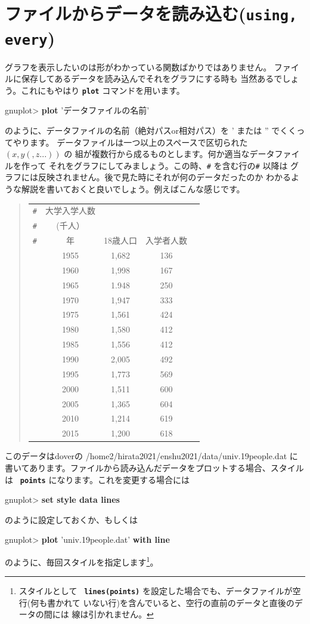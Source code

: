 \documentclass[a4j]{ujarticle} %
\newenvironment{terminal}{%
  \begin{center}
   \begin{minipage}{.8\textwidth}
    \setlength{\FrameSep}{.5\FrameSep}%
    \begin{framed}\ttfamily\small%
     \setlength\baselineskip{.85\baselineskip}%
}{%
    \end{framed}
   \end{minipage}
  \end{center}%
}
\begin{document}
\section{ファイルからデータを読み込む({\tt\bf using, every})}
グラフを表示したいのは形がわかっている関数ばかりではありません。
ファイルに保存してあるデータを読み込んでそれをグラフにする時も
当然あるでしょう。これにもやはり {\tt\bf plot} コマンドを用います。
\begin{terminal}
gnuplot> {\bf plot} 'データファイルの名前'
\end{terminal}
のように、データファイルの名前（絶対パスor相対パス）を ' または '' でくくってやります。
データファイルは一つ以上のスペースで区切られた $(x,y(,z...))$ の
組が複数行から成るものとします。何か適当なデータファイルを作って
それをグラフにしてみましょう。この時、{\tt \#} を含む行の{\tt \#} 以降は
グラフには反映されません。後で見た時にそれが何のデータだったのか
わかるような解説を書いておくと良いでしょう。例えばこんな感じです。
\begin{quote}
 \renewcommand{\arraystretch}{0.7}
\begin{tabular}{lcccc}
{\tt \#} & 大学入学人数 & & & \\
{\tt \#} & (千人） & & & \\
{\tt \#} & 年 & 18歳人口 & 入学者人数\\
&  1955 & 1,682 & 136 \\
&  1960 & 1,998 & 167 \\
&  1965 & 1.948 & 250 \\
&  1970 & 1,947 & 333 \\
&  1975 & 1,561 & 424 \\
&  1980 & 1,580 & 412 \\
&  1985 & 1,556 & 412 \\
&  1990 & 2,005 & 492 \\
&  1995 & 1,773 & 569 \\
&  2000 & 1,511 & 600 \\
&  2005 & 1,365 & 604 \\
&  2010 & 1,214 & 619 \\
&  2015 & 1,200 & 618 \\
\end{tabular}
\end{quote}

このデータはdoverの /home2/hirata2021/enshu2021/data/univ.19people.dat に書いてあります。ファイルから読み込んだデータをプロットする場合、スタイルは {\bf\tt
points} になります。これを変更する場合には
\begin{terminal}
gnuplot> {\bf set style data lines}
\end{terminal}
のように設定しておくか、もしくは
\begin{terminal}
gnuplot> {\bf plot} 'univ.19people.dat' {\bf with line}
\end{terminal}
のように、毎回スタイルを指定します\footnote{スタイルとして {\bf\tt
lines(points)} を設定した場合でも、データファイルが空行(何も書かれて
いない行)を含んでいると、空行の直前のデータと直後のデータの間には
線は引かれません。}。
\end{document}
